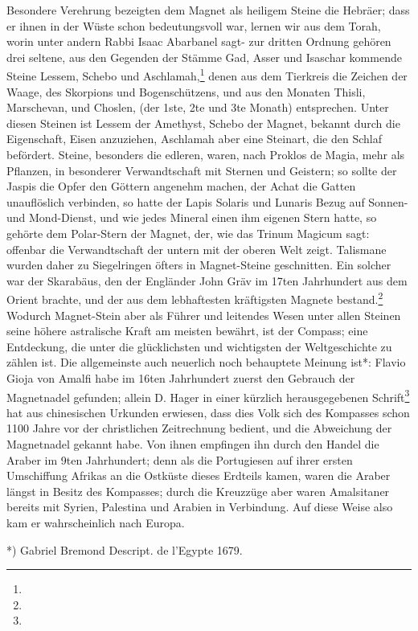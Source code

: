 \documentclass[a4paper, 11pt, oneside, polutonikogreek, german]{article}
\begin{document}
Besondere Verehrung bezeigten dem Magnet als heiligem Steine die Hebräer; dass er ihnen in der Wüste schon bedeutungsvoll war, lernen wir aus dem Torah, worin unter andern Rabbi Isaac Abarbanel sagt- zur dritten Ordnung gehören drei seltene, aus den Gegenden der Stämme Gad, Asser und Isaschar kommende Steine Lessem, Schebo und Aschlamah,\footnote{} denen aus dem Tierkreis die Zeichen der Waage, des Skorpions und Bogenschützens, und aus den Monaten Thisli, Marschevan, und Choslen, (der 1ste, 2te und 3te Monath) entsprechen. Unter diesen Steinen ist Lessem der Amethyst, Schebo der Magnet, bekannt durch die Eigenschaft, Eisen anzuziehen, Aschlamah aber eine Steinart, die den Schlaf befördert. Steine, besonders die edleren, waren, nach Proklos de Magia, mehr als Pflanzen, in besonderer Verwandtschaft mit Sternen und Geistern; so sollte der Jaspis die Opfer den Göttern angenehm machen, der Achat die Gatten unauflöslich verbinden, so hatte der Lapis Solaris und Lunaris Bezug auf Sonnen- und Mond-Dienst, und wie jedes Mineral einen ihm eigenen Stern hatte, so gehörte dem Polar-Stern der Magnet, der, wie das Trinum Magicum sagt: offenbar die Verwandtschaft der untern mit der oberen Welt zeigt. Talismane wurden daher zu Siegelringen öfters in Magnet-Steine geschnitten. Ein solcher war der Skarabäus, den der Engländer John Gräv im 17ten Jahrhundert aus dem Orient brachte, und der aus dem lebhaftesten kräftigsten Magnete bestand.\footnote{} Wodurch Magnet-Stein aber als Führer und leitendes Wesen unter allen Steinen seine höhere astralische Kraft am meisten bewährt, ist der Compass; eine Entdeckung, die unter die glücklichsten und wichtigsten der Weltgeschichte zu zählen ist. Die allgemeinste auch neuerlich noch behauptete Meinung ist*: Flavio Gioja von Amalfi habe im 16ten Jahrhundert zuerst den Gebrauch der Magnetnadel gefunden; allein D. Hager in einer kürzlich herausgegebenen Schrift\footnote{} hat aus chinesischen Urkunden erwiesen, dass dies Volk sich des Kompasses schon 1100 Jahre vor der christlichen Zeitrechnung bedient, und die Abweichung der Magnetnadel gekannt habe. Von ihnen empfingen ihn durch den Handel die Araber im 9ten Jahrhundert; denn als die Portugiesen auf ihrer ersten Umschiffung Afrikas an die Ostküste dieses Erdteils kamen, waren die Araber längst in Besitz des Kompasses; durch die Kreuzzüge aber waren Amalsitaner bereits mit Syrien, Palestina und Arabien in Verbindung. Auf diese Weise also kam er wahrscheinlich nach Europa.

*) Gabriel Bremond Descript. de l'Egypte 1679.
\end{document}
